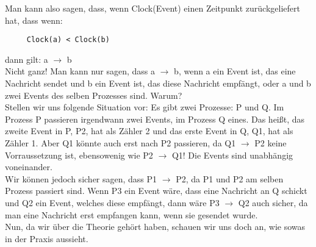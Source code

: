 \documentclass[a4paper,11pt]{report}
\begin{document}
Man kann also sagen, dass, wenn Clock(Event) einen Zeitpunkt zurückgeliefert hat, dass wenn:
\begin{verbatim}
	 Clock(a) < Clock(b)	
\end{verbatim}
dann gilt: a $\rightarrow$ b\\
Nicht ganz! Man kann nur sagen, dass a $\rightarrow$ b, wenn a ein Event ist, das eine Nachricht sendet und b ein Event ist, das diese Nachricht empfängt, oder a und b zwei Events des selben Prozesses sind. Warum?\\
Stellen wir uns folgende Situation vor: Es gibt zwei Prozesse: P und Q. Im Prozess P passieren irgendwann zwei Events, im Prozess Q eines. Das heißt, das zweite Event in P, P2, hat als Zähler 2 und das erste Event in Q, Q1, hat als Zähler 1. Aber Q1 könnte auch erst nach P2 passieren, da Q1 $\rightarrow$ P2 keine Vorraussetzung ist, ebensowenig wie P2 $\rightarrow$ Q1! Die Events sind unabhängig voneinander.\\
Wir können jedoch sicher sagen, dass P1 $\rightarrow$ P2, da P1 und P2 am selben Prozess passiert sind. Wenn P3 ein Event wäre, dass eine Nachricht an Q schickt und Q2 ein Event, welches diese empfängt, dann wäre P3 $\rightarrow$ Q2 auch sicher, da man eine Nachricht erst empfangen kann, wenn sie gesendet wurde.\\
Nun, da wir über die Theorie gehört haben, schauen wir uns doch an, wie sowas in der Praxis aussieht.
\end{document}
